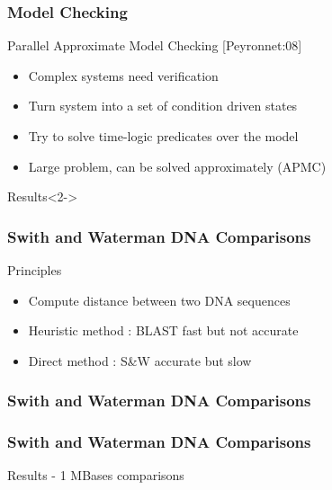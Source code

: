 \frame
{
  \frametitle{Model Checking}
  \begin{block}{Parallel Approximate Model Checking [Peyronnet:08]}
  \begin{itemize}
  \footnotesize
  \item Complex systems need verification
  \item Turn system into a set of condition driven states
  \item Try to solve time-logic predicates over the model
  \item Large problem, can be solved approximately (APMC)
  \end{itemize}
  \end{block}{}

  \begin{block}{Results}<2->
  \end{block}{}

}

\frame
{
  \frametitle{Swith and Waterman DNA Comparisons}
  \begin{block}{Principles}
  \begin{itemize}
  \footnotesize
  \item Compute distance between two DNA sequences
  \item Heuristic method : BLAST fast but not accurate
  \item Direct method : S\&W accurate but slow
  \end{itemize}
  \end{block}{}
}
\frame
{
  \frametitle{Swith and Waterman DNA Comparisons}
\begin{center}\end{center}
}
\frame
{
  \frametitle{Swith and Waterman DNA Comparisons}
  \begin{block}{Results - 1 MBases comparisons}
  \end{block}{}
}
